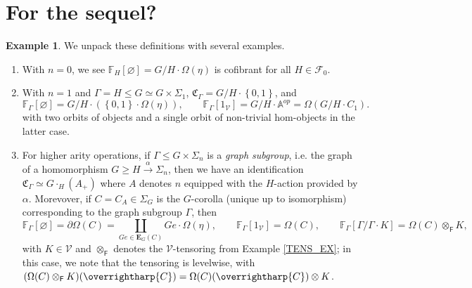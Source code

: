 \documentclass[a4paper,10pt
,draft
]{article}%
\numberwithin{equation}{section}
\numberwithin{figure}{section}
\theoremstyle{definition} %
\newtheorem{example}[equation]{Example}%
\newcommand{\set}[1]{\left\{#1\right\}}%
\newcommand{\vect}[1]{\text{\overrightharp{\ensuremath{#1}}}}
\newcommand{\Fin}{\mathsf{F}}%
\newcommand{\V}{\ensuremath{\mathcal V}}
\newcommand{\1}{\ensuremath{\mathbbm 1}}%
\begin{document}
\section{For the sequel?}



\begin{example}
	\label{FREEOP_EX}
	We unpack these definitions with several examples.
	\begin{enumerate}[label = (\roman*)]
		\item With $n = 0$, we see $\mathbb F_H[\varnothing] = G/H \cdot \Omega(\eta)$ is cofibrant for all $H \in \mathcal F_0$.
		\item With $n = 1$ and $\Gamma = H \leq G \simeq G \times \Sigma_1$, $\mathfrak C_\Gamma = G/H \cdot \set{0,1}$, and
		\[
		\mathbb F_{\Gamma}[\varnothing] = G/H \cdot (\set{0,1} \cdot \Omega(\eta)),
		\qquad
		\mathbb F_{\Gamma}[1_\V] = G/H \cdot \mathbb A^{op} = \Omega(G/H \cdot C_1).
		\]
		with two orbits of objects and a single orbit of non-trivial hom-objects in the latter case.
		\item For higher arity operations,
		if $\Gamma \leq G \times \Sigma_n$ is a \textit{graph subgroup}, i.e. the graph of a homomorphism $G \geq H \xrightarrow{\alpha} \Sigma_n$, then
		we have an identification $\mathfrak C_{\Gamma} \simeq G \cdot_H (A_+)$ where $A$ denotes $n$ equipped with the $H$-action provided by $\alpha$.
		Morevover, if $C = C_A \in \Sigma_G$ is the $G$-corolla (unique up to isomorphism) corresponding to the graph subgroup $\Gamma$, then
		\[
		\mathbb F_\Gamma[\varnothing] = \partial\Omega(C) = \coprod_{Ge \in \boldsymbol{E}_G(C)} Ge \cdot \Omega(\eta),
		\qquad
		\mathbb F_{\Gamma}[1_\V] = \Omega(C),
		\qquad
		\mathbb F_\Gamma[\Gamma/\Gamma \cdot K] = \Omega(C) \otimes_\Fin K,
		\]
		with $K \in \V$ and $\otimes_\Fin$ denotes the $\V$-tensoring from Example \ref{TENS_EX};
		in this case, we note that the tensoring is levelwise, with
		$(\Omega(C) \otimes_\Fin K)(\vect C) = \Omega(C)(\vect C) \otimes K$.            
		

\end{enumerate}
\end{example}
\end{document}

